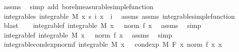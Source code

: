 \begin{isabellebody}
\ assms{\isacharparenleft}{\kern0pt}{}{\isacharparenright}{\kern0pt}\ \isamarkupfalse%
\ {\isacharparenleft}{\kern0pt}simp\ add{\isacharcolon}{\kern0pt}\ borel{\isacharunderscore}{\kern0pt}measurable{\isacharunderscore}{\kern0pt}simple{\isacharunderscore}{\kern0pt}function{\isacharparenright}{\kern0pt}\isanewline
\ \ \isamarkupfalse%
\ integrable{\isacharunderscore}{\kern0pt}s{\isacharcolon}{\kern0pt}\ {\isachardoublequoteopen}integrable\ M\ {\isacharparenleft}{\kern0pt}{\isasymlambda}x{\isachardot}{\kern0pt}\ s\ i\ x{\isacharparenright}{\kern0pt}{\isachardoublequoteclose}\ \ i\ \isamarkupfalse%
\ assms{\isacharparenleft}{\kern0pt}{}{\isacharparenright}{\kern0pt}\ assms{\isacharparenleft}{\kern0pt}{}{\isacharparenright}{\kern0pt}\ integrable{\isacharunderscore}{\kern0pt}simple{\isacharunderscore}{\kern0pt}function\ \isamarkupfalse%
\ blast\isanewline
\ \ \isamarkupfalse%
\ integrable{\isacharunderscore}{\kern0pt}{}f{\isacharcolon}{\kern0pt}\ {\isachardoublequoteopen}integrable\ M\ {\isacharparenleft}{\kern0pt}{\isasymlambda}x{\isachardot}{\kern0pt}\ {}\ {\isacharasterisk}{\kern0pt}\ norm\ {\isacharparenleft}{\kern0pt}f\ x{\isacharparenright}{\kern0pt}{\isacharparenright}{\kern0pt}{\isachardoublequoteclose}\ \isamarkupfalse%
\ assms{\isacharparenleft}{\kern0pt}{}{\isacharparenright}{\kern0pt}\ \isamarkupfalse%
\ simp\isanewline
\ \ \isamarkupfalse%
\ integrable{\isacharunderscore}{\kern0pt}{}f{\isacharcolon}{\kern0pt}\ {\isachardoublequoteopen}integrable\ M\ {\isacharparenleft}{\kern0pt}{\isasymlambda}x{\isachardot}{\kern0pt}\ {}\ {\isacharasterisk}{\kern0pt}\ norm\ {\isacharparenleft}{\kern0pt}f\ x{\isacharparenright}{\kern0pt}{\isacharparenright}{\kern0pt}{\isachardoublequoteclose}\ \isamarkupfalse%
\ assms{\isacharparenleft}{\kern0pt}{}{\isacharparenright}{\kern0pt}\ \isamarkupfalse%
\ simp\isanewline
\ \ \isamarkupfalse%
\ integrable{\isacharunderscore}{\kern0pt}{}{\isacharunderscore}{\kern0pt}cond{\isacharunderscore}{\kern0pt}exp{\isacharunderscore}{\kern0pt}norm{\isacharunderscore}{\kern0pt}f{\isacharcolon}{\kern0pt}\ {\isachardoublequoteopen}integrable\ M\ {\isacharparenleft}{\kern0pt}{\isasymlambda}x{\isachardot}{\kern0pt}\ {}\ {\isacharasterisk}{\kern0pt}\ cond{\isacharunderscore}{\kern0pt}exp\ M\ F\ {\isacharparenleft}{\kern0pt}{\isasymlambda}x{\isachardot}{\kern0pt}\ norm\ {\isacharparenleft}{\kern0pt}f\ x{\isacharparenright}{\kern0pt}{\isacharparenright}{\kern0pt}\ x{\isacharparenright}{\kern0pt}{\isachardoublequoteclose}\ \isamarkupfalse%

\end{isabellebody}
